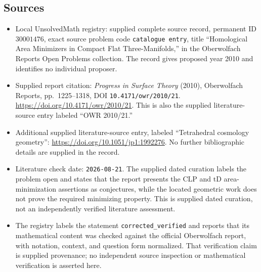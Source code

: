\documentclass[11pt]{article}
\begin{document}
\subsection{Sources}
\begin{itemize}
\item Local UnsolvedMath registry: supplied complete source record, permanent ID \(30001476\), exact source problem code \texttt{catalogue entry}, title ``Homological Area Minimizers in Compact Flat Three-Manifolds,'' in the Oberwolfach Reports Open Problems collection. The record gives proposed year 2010 and identifies no individual proposer.
\item Supplied report citation: \emph{Progress in Surface Theory} (2010), Oberwolfach Reports, pp.\ 1225--1318, DOI \texttt{10.4171/owr/2010/21}. \url{https://doi.org/10.4171/owr/2010/21}. This is also the supplied literature-source entry labeled ``OWR 2010/21.''
\item Additional supplied literature-source entry, labeled ``Tetrahedral cosmology geometry'': \url{https://doi.org/10.1051/jp1:1992276}. No further bibliographic details are supplied in the record.
\item Literature check date: \texttt{2026-08-21}. The supplied dated curation labels the problem open and states that the report presents the \(\mathrm{CLP}\) and \(\mathrm{tD}\) area-minimization assertions as conjectures, while the located geometric work does not prove the required minimizing property. This is supplied dated curation, not an independently verified literature assessment.
\item The registry labels the statement \texttt{corrected\_verified} and reports that its mathematical content was checked against the official Oberwolfach report, with notation, context, and question form normalized. That verification claim is supplied provenance; no independent source inspection or mathematical verification is asserted here.
\end{itemize}
\end{document}
